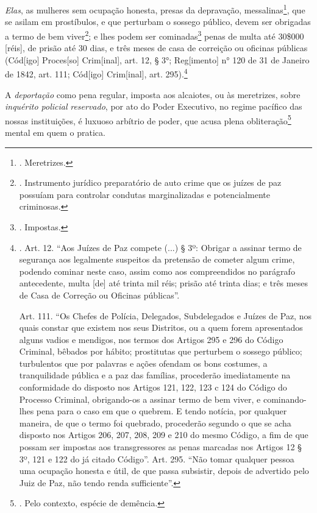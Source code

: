 \emph{Elas}, as mulheres sem ocupação honesta, presas da depravação,
messalinas\footnote{. Meretrizes.}, que se asilam em prostíbulos, e que
perturbam o sossego público, devem ser obrigadas a termo de bem
viver\footnote{. Instrumento jurídico preparatório de auto crime que os
  juízes de paz possuíam para controlar condutas marginalizadas e
  potencialmente criminosas.}; e lhes podem ser cominadas\footnote{.
  Impostas.} penas de multa até 30\$000 {[}réis{]}, de prisão até 30
dias, e três meses de casa de correição ou oficinas públicas
(Cód{[}igo{]} Proces{[}so{]} Crim{[}inal{]}, art. 12, § 3°;
Reg{[}imento{]} n° 120 de 31 de Janeiro de 1842, art. 111; Cód{[}igo{]}
Crim{[}inal{]}, art. 295).\footnote{. Art. 12. ``Aos Juízes de Paz
  compete (...) § 3º: Obrigar a assinar termo de segurança aos
  legalmente suspeitos da pretensão de cometer algum crime, podendo
  cominar neste caso, assim como aos compreendidos no parágrafo
  antecedente, multa {[}de{]} até trinta mil réis; prisão até trinta
  dias; e três meses de Casa de Correção ou Oficinas públicas''.

  Art. 111. ``Os Chefes de Polícia, Delegados, Subdelegados e Juízes de
  Paz, nos quais constar que existem nos seus Distritos, ou a quem forem
  apresentados al­guns vadios e mendigos, nos termos dos Artigos 295 e
  296 do Código Criminal, bêbados por hábito; prostitu­tas que perturbem
  o sossego público; turbulentos que por palavras e ações ofendam os
  bons costumes, a tranquilidade pública e a paz das famílias,
  procederão ime­diatamente na conformidade do disposto nos Artigos 121,
  122, 123 c 124 do Código do Processo Criminal, obri­gando-os a assinar
  termo de bem viver, e cominando-lhes pena para o caso em que o
  quebrem. E tendo notícia, por qualquer maneira, de que o termo foi
  que­brado, procederão segundo o que se acha disposto nos Artigos 206,
  207, 208, 209 e 210 do mesmo Código, a fim de que possam ser impostas
  aos transgressores as penas marcadas nos Artigos 12 § 3º, 121 e 122 do
  já citado Código''. Art. 295. ``Não tomar qualquer pessoa uma ocupação
  honesta e útil, de que passa subsistir, depois de advertido pelo Juiz
  de Paz, não tendo renda sufficiente''.}

A \emph{deportação} como pena regular, imposta aos alcaiotes, ou às
meretrizes, sobre \emph{inquérito policial} \emph{reservado}, por ato do
Poder Executivo, no regime pacífico das nossas instituições, é luxuoso
arbítrio de poder, que acusa plena obliteração\footnote{. Pelo contexto,
  espécie de demência.} mental em quem o pratica.

